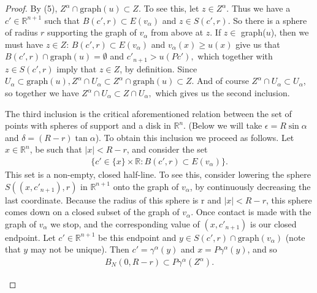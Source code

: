 \documentclass[10pt]{article}
\begin{document}
\begin{proof}
By (5), $Z^{\alpha}\cap \text{graph}(u)\subset Z$. To see this, let $z\in Z^{\alpha}$. Thus we have a $c'\in \mathbb{R}^{n+1}$ such that $B(c',r)\subset E(v_{\alpha})$ and $z\in S(c',r)$. So there is a sphere of radius $r$ supporting the graph of $v_{\alpha}$ from above at $z$. If $z\in$ graph($u$), then we must have $z \in Z$:  $B(c',r)\subset E(v_{\alpha})$ and $v_{\alpha}(x)\geq u(x)$ give us that $B(c',r)\cap\text{graph}(u)=\emptyset$ and $c'_{n+1}> u(Pc'),$ which together with $z\in S(c',r)$ imply that $z \in Z$, by definition. Since $U_{\alpha}\subset \text{graph}(u), Z^{\alpha}\cap U_{\alpha}\subset Z^{\alpha} \cap \text{graph}(u)\subset Z$. And of course $Z^{\alpha}\cap U_{\alpha}\subset U_{\alpha}$, so together we have $Z^{\alpha}\cap U_{\alpha} \subset Z\cap U_{\alpha},$ which gives us the second inclusion.

The third inclusion is the critical aforementioned relation between the set of points with spheres of support and a disk in $\mathbb{R}^n$. (Below we will take $\epsilon=R\sin\alpha$ and $\delta=(R-r)\tan\alpha$). To obtain this inclusion we proceed as follows. Let $x\in \mathbb{R}^n$, be such that $|x|<R-r$, and consider the set \begin{align}
\{c'\in \{x\} \times \mathbb{R}: B(c',r)\subset E(v_{\alpha}) \}.
\end{align}
This set is a non-empty, closed half-line. To see this, consider lowering the sphere $S((x,c'_{n+1}),r)$ in $\mathbb{R}^{n+1}$ onto the graph of $v_{\alpha}$, by continuously decreasing the last coordinate. Because the radius of this sphere is r and $|x|<R-r$, this sphere comes down on a closed subset of the graph of $v_{\alpha}$. Once contact is made with the graph of $v_{\alpha}$ we stop, and the corresponding value of $(x,c'_{n+1})$ is our closed endpoint. Let $c'\in\mathbb{R}^{n+1}$ be this endpoint and $y\in S(c',r)\cap \text{graph}(v_{\alpha})$ (note that $y$ may not be unique). Then $c'=\gamma^{\alpha}(y)$ and $x=P\gamma^{\alpha}(y)$, and so
\begin{align}
B_{N}(0,R-r)\subset P\gamma^{\alpha}(Z^{\alpha}).
\end{align}
\begin{figure}[H]
\centering
{}
\end{figure}
\end{proof}
\end{document}

